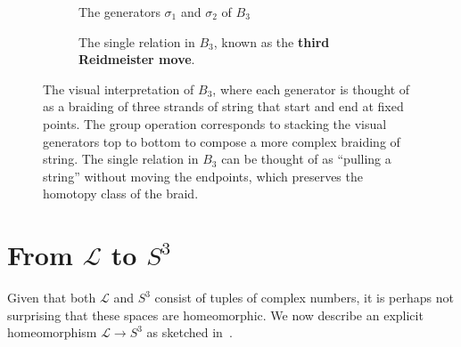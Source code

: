 \documentclass[12pt,twoside]{reedthesis}
\theoremstyle{definition}
\newcommand{\LS}{\mathcal{L}}
\begin{document}
\vspace{1em}
\begin{figure}[h]
  \centering
  \begin{subfigure}[t]{0.48\textwidth}
    \centering
    \hspace{10mm}
    \caption{The generators $\sigma_1$ and $\sigma_2$ of $B_3$}
  \end{subfigure}
  \hfill
  \begin{subfigure}[t]{0.48\textwidth}
    \centering
    \caption{The single relation in $B_3$, known as the \textbf{third Reidmeister move}.}
  \end{subfigure}
  \caption{The visual interpretation of $B_3$, where each generator is thought of as a braiding of three strands of string that start and end at fixed points. The group operation corresponds to stacking the visual generators top to bottom to compose a more complex braiding of string. The single relation in $B_3$ can be thought of as ``pulling a string'' without moving the endpoints, which preserves the homotopy class of the braid.}
  \label{fig:visual_braid_group}
\end{figure}

\section{From $\LS$ to $S^3$}\label{subsec:lattice_to_s3}

Given that both $\LS$ and $S^3$ consist of tuples of complex numbers, it is perhaps not surprising that these spaces are homeomorphic.
We now describe an explicit homeomorphism $\LS \to S^3$ as sketched in~\cite{mostovoy2004}.
\end{document}

